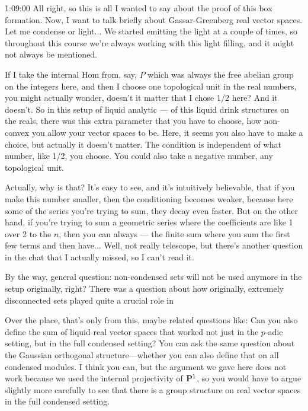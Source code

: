\begin{unfinished}{1:09:00}
All right, so this is all I wanted to say about the proof of this box formation. Now, I want to talk briefly about Gassar-Greenberg real vector spaces. Let me condense or light... We started emitting the light at a couple of times, so throughout this course we're always working with this light filling, and it might not always be mentioned.

If I take the internal Hom from, say, $P$ which was always the free abelian group on the integers here, and then I choose one topological unit in the real numbers, you might actually wonder, doesn't it matter that I chose 1/2 here? And it doesn't. So in this setup of liquid analytic --- of this liquid drink structures on the reals, there was this extra parameter that you have to choose, how non-convex you allow your vector spaces to be. Here, it seems you also have to make a choice, but actually it doesn't matter. The condition is independent of what number, like 1/2, you choose. You could also take a negative number, any topological unit.

Actually, why is that? It's easy to see, and it's intuitively believable, that if you make this number smaller, then the conditioning becomes weaker, because here some of the series you're trying to sum, they decay even faster. But on the other hand, if you're trying to sum a geometric series where the coefficients are like 1 over 2 to the $n$, then you can always --- the finite sum where you sum the first few terms and then have... Well, not really telescope, but there's another question in the chat that I actually missed, so I can't read it.

By the way, general question: non-condensed sets will not be used anymore in the setup originally, right? There was a question about how originally, extremely disconnected sets played quite a crucial role in

Over the place, that's only from this, maybe related questions like: Can you also define the sum of liquid real vector spaces that worked not just in the $p$-adic setting, but in the full condensed setting? You can ask the same question about the Gaussian orthogonal structure---whether you can also define that on all condensed modules. I think you can, but the argument we gave here does not work because we used the internal projectivity of $\P^1$, so you would have to argue slightly more carefully to see that there is a group structure on real vector spaces in the full condensed setting.


\end{unfinished}
